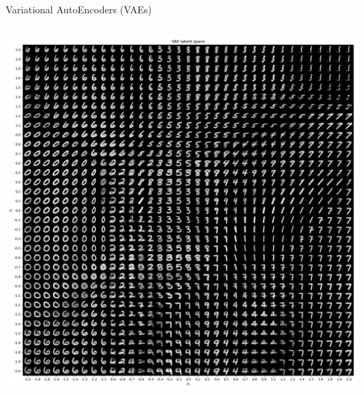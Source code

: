 \begin{frame}[allowframebreaks]{Variational AutoEncoders (VAEs)}
\begin{columns}
        \begin{center}
            \includegraphics[width=1\textwidth]{../resources/vae/vae_latent_space_sample.png}
        \end{center}
    \end{columns}    
\end{frame}
